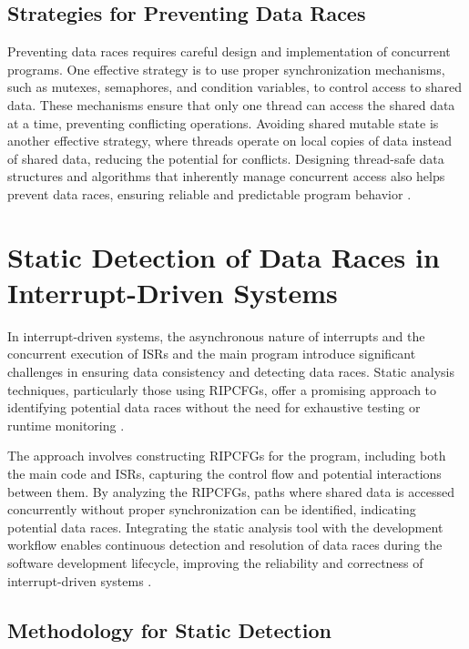 \documentclass[
fancyheadings, %
%
%
]{stsreprt}
\begin{document}
{\subsection{Strategies for Preventing Data Races}

Preventing data races requires careful design and implementation of concurrent programs. One effective strategy is to use proper synchronization mechanisms, such as mutexes, semaphores, and condition variables, to control access to shared data. These mechanisms ensure that only one thread can access the shared data at a time, preventing conflicting operations. Avoiding shared mutable state is another effective strategy, where threads operate on local copies of data instead of shared data, reducing the potential for conflicts. Designing thread-safe data structures and algorithms that inherently manage concurrent access also helps prevent data races, ensuring reliable and predictable program behavior \cite{herlihy2008}.

\section{Static Detection of Data Races in Interrupt-Driven Systems}

In interrupt-driven systems, the asynchronous nature of interrupts and the concurrent execution of ISRs and the main program introduce significant challenges in ensuring data consistency and detecting data races. Static analysis techniques, particularly those using RIPCFGs, offer a promising approach to identifying potential data races without the need for exhaustive testing or runtime monitoring \cite{wang2020}.

The approach involves constructing RIPCFGs for the program, including both the main code and ISRs, capturing the control flow and potential interactions between them. By analyzing the RIPCFGs, paths where shared data is accessed concurrently without proper synchronization can be identified, indicating potential data races. Integrating the static analysis tool with the development workflow enables continuous detection and resolution of data races during the software development lifecycle, improving the reliability and correctness of interrupt-driven systems \cite{wang2020}.

\subsection{Methodology for Static Detection}

}
\end{document}
